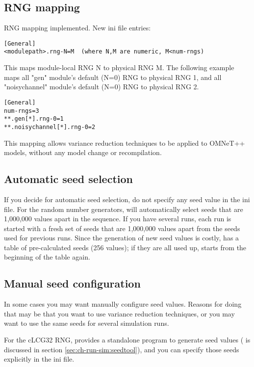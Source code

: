 \subsection{RNG mapping}

RNG mapping implemented. New ini file entries:

\begin{verbatim}
[General]
<modulepath>.rng-N=M  (where N,M are numeric, M<num-rngs)
\end{verbatim}

This maps module-local RNG N to physical RNG M. The following
example maps all "gen" module's default (N=0) RNG to physical RNG 1,
and all "noisychannel" module's default (N=0) RNG to physical RNG 2.

\begin{verbatim}
[General]
num-rngs=3
**.gen[*].rng-0=1
**.noisychannel[*].rng-0=2
\end{verbatim}

This mapping allows variance reduction techniques to be applied to
OMNeT++ models, without any model change or recompilation.


\subsection{Automatic seed selection}

If you decide for automatic seed selection,
do not specify any seed value in the ini file. For the
random number generators, {\opp} will automatically select seeds that
are 1,000,000 values apart in the sequence. If you have several runs,
each run is started with a fresh set of seeds that are 1,000,000
values apart from the seeds used for previous runs. Since the
generation of new seed values is costly, {\opp} has a table of
pre-calculated seeds (256 values); if they are all used up, {\opp}
starts from the beginning of the table again.

\subsection{Manual seed configuration}

In some cases you may want manually configure seed values.
Reasons for doing that may be that you want to use variance reduction
techniques, or you may want to use the same seeds for several simulation
runs.

For the cLCG32 RNG, {\opp} provides a standalone program to generate
seed values ( is discussed in section
\ref{sec:ch-run-sim:seedtool}), and you can specify those seeds explicitly
in the ini file.

